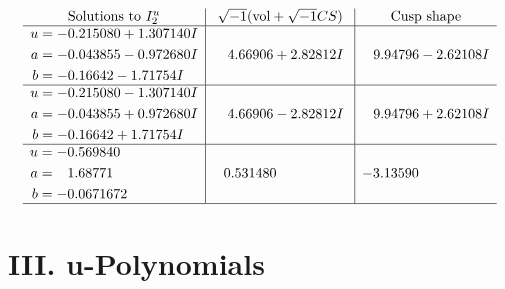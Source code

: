 \documentclass[1p]{elsarticle_modified}
\theoremstyle{definition}
\newcommand{\I}{\sqrt{-1}}
\begin{document}
$$\begin{array}{c|c|c}  
\text{Solutions to }I^u_{2}& \I (\text{vol} + \sqrt{-1}CS) & \text{Cusp shape}\\
 \hline 
\begin{aligned}
u &= -0.215080 + 1.307140 I \\
a &= -0.043855 - 0.972680 I \\
b &= -0.16642 - 1.71754 I\end{aligned}
 & \phantom{-}4.66906 + 2.82812 I & \phantom{-}9.94796 - 2.62108 I \\ \hline\begin{aligned}
u &= -0.215080 - 1.307140 I \\
a &= -0.043855 + 0.972680 I \\
b &= -0.16642 + 1.71754 I\end{aligned}
 & \phantom{-}4.66906 - 2.82812 I & \phantom{-}9.94796 + 2.62108 I \\ \hline\begin{aligned}
u &= -0.569840\phantom{ +0.000000I} \\
a &= \phantom{-}1.68771\phantom{ +0.000000I} \\
b &= -0.0671672\phantom{ +0.000000I}\end{aligned}
 & \phantom{-}0.531480\phantom{ +0.000000I} & -3.13590\phantom{ +0.000000I}\\
 \hline 
 \end{array}$$\newpage
\newpage\renewcommand{\arraystretch}{1}
\centering \section*{ III. u-Polynomials}
\end{document}

